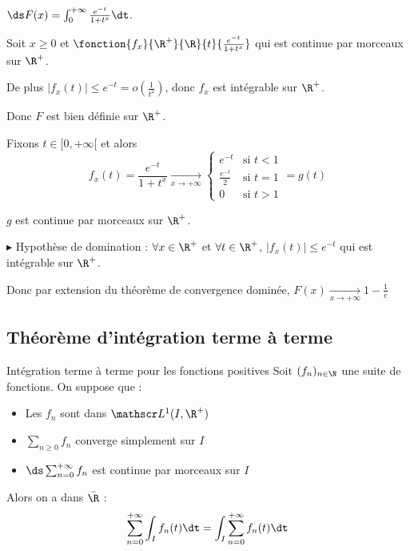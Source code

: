\begin{exemple}
    $\ds F(x) = \int_0^{+ \infty} \frac{e^{-t}}{1 + t^x} \dt$.

    Soit $x \geqslant 0$ et $\fonction {f_x}{\R^+}{\R}{t}{\frac{e^{-t}}{1 + t^x}}$ qui est continue par morceaux sur $\R^+$.

    De plus $|f_x(t)| \leqslant e^{-t} = o\left( \frac 1 {t^2} \right)$, donc $f_x$ est intégrable sur $\R^+$.

    Donc $F$ est bien définie sur $\R^+$.

    Fixons $t \in [0, + \infty[ $ et alors 
    $$f_x(t) = \frac{e^{-t}}{1 + t^x} \xrightarrow[x \to + \infty]{} \begin{cases}
        e^{-t} & \text{si } t < 1 \\
        \frac{e^{-t}}{2} & \text{si } t = 1 \\
        0 & \text{si } t > 1
    \end{cases} = g(t)$$

    $g$ est continue par morceaux sur $\R^+$. 

    $\blacktriangleright$ Hypothèse de domination : $\forall x \in \R^+$ et $\forall t \in \R^+$, $|f_x(t)| \leqslant e^{-t}$ qui est intégrable sur $\R^+$.

    Donc par extension du théorème de convergence dominée, $F(x) \xrightarrow[x \to + \infty]{} 1 - \frac 1 e$
\end{exemple}

\subsection{Théorème d'intégration terme à terme}

\begin{theoreme}{Intégration terme à terme pour les fonctions positives}{}
    Soit $(f_n)_{n \in \N}$ une suite de fonctions. On suppose que : 
    \begin{itemize}
        \item Les $f_n$ sont dans $\mathscr L^1(I, \R^+)$
        \item $\sum_{n \geqslant 0} f_n$ converge simplement sur $I$
        \item $\ds \sum_{n = 0}^{+ \infty} f_n$ est continue par morceaux sur $I$
    \end{itemize}
    Alors on a dans $\bar{\R}$ : 
    $$\sum_{n = 0}^{+ \infty} \int_I f_n(t) \dt = \int_I \sum_{n = 0}^{+ \infty} f_n(t) \dt$$
\end{theoreme}

